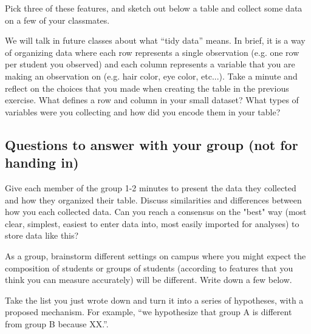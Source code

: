 \documentclass{article}\usepackage[]{graphicx}\usepackage[]{color}
\begin{document}
\bigskip

\begin{exercise}
Pick three of these features, and sketch out below a table and collect some data on a few of your classmates. 
\end{exercise}

\clearpage

\begin{exercise}
We will talk in future classes about what ``tidy data'' means. In brief, it is a way of organizing data where each row represents a single observation (e.g. one row per student you observed) and each column represents a variable that you are making an observation on (e.g. hair color, eye color, etc...). Take a minute and reflect on the choices that you made when creating the table in the previous exercise. What defines a row and column in your small dataset? What types of variables were you collecting and how did you encode them in your table?
\end{exercise}

\vspace{5em}

\subsection*{Questions to answer with your group (not for handing in)}


\begin{exercise}
Give each member of the group 1-2 minutes to present the data they collected and how they organized their table. Discuss similarities and differences between how you each collected data. Can you reach a consensus on the "best" way (most clear, simplest, easiest to enter data into, most easily imported for analyses) to store data like this?
\end{exercise}

\begin{exercise}
As a group, brainstorm different settings on campus where you might expect the composition of students or groups of students (according to features that you think you can measure accurately) will be different. Write down a few below. 
\end{exercise}

\vspace{7em}

\begin{exercise}
Take the list you just wrote down and turn it into a series of hypotheses, with a proposed mechanism. For example, ``we hypothesize that group A is different from group B because XX.''.
\end{exercise}
\end{document}
